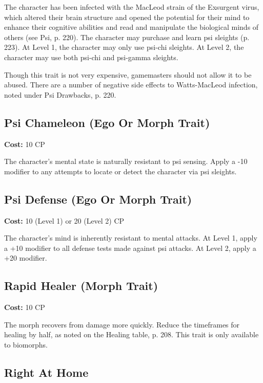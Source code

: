 The character has been infected with the MacLeod strain of the Exsurgent virus, which altered their brain structure and opened the potential for their mind to enhance their cognitive abilities and read and manipulate the biological minds of others (see Psi, p. 220). The character may purchase and learn psi sleights (p. 223). At Level 1, the character may only use psi-chi sleights. At Level 2, the character may use both psi-chi and psi-gamma sleights. 

Though this trait is not very expensive, gamemasters should not allow it to be abused. There are a number of negative side effects to Watts-MacLeod infection, noted under Psi Drawbacks, p. 220. 

\subsection{Psi Chameleon (Ego Or Morph Trait)} \label{sec:traits-psi-chameleon} 

\textbf{Cost:} 10 CP 

The character’s mental state is naturally resistant to psi sensing. Apply a -10 modifier to any attempts to locate or detect the character via psi sleights. 

\subsection{Psi Defense (Ego Or Morph Trait)} \label{sec:traits-psi-defense} 

\textbf{Cost:} 10 (Level 1) or 20 (Level 2) CP 

The character’s mind is inherently resistant to mental attacks. At Level 1, apply a +10 modifier to all defense tests made against psi attacks. At Level 2, apply a +20 modifier. 

\subsection{Rapid Healer (Morph Trait)} \label{sec:traits-rapid-healer} 

\textbf{Cost:} 10 CP 

The morph recovers from damage more quickly. Reduce the timeframes for healing by half, as noted on the Healing table, p. 208. This trait is only available to biomorphs. 

\subsection{Right At Home} \label{sec:traits-right-at-home} 

